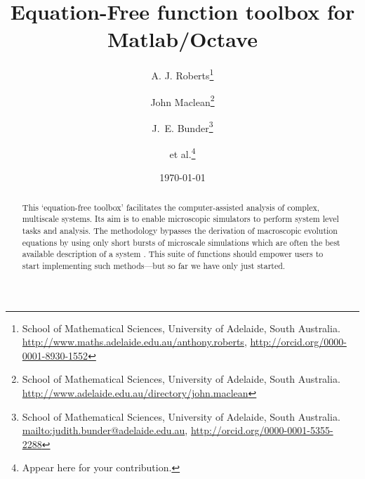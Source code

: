 \documentclass[11pt,a5paper,twoside]{article}
\title{Equation-Free function toolbox for Matlab/Octave}
\author{A. J. Roberts\thanks{%
School of Mathematical Sciences, University of Adelaide, South Australia.
\url{http://www.maths.adelaide.edu.au/anthony.roberts},
\url{http://orcid.org/0000-0001-8930-1552}}
\and John Maclean\thanks{%
School of Mathematical Sciences, University of Adelaide, South Australia.
\url{http://www.adelaide.edu.au/directory/john.maclean}}
\and J.~E. Bunder\thanks{%
School of Mathematical Sciences, University of Adelaide, South Australia.
\protect\url{mailto:judith.bunder@adelaide.edu.au},
\protect\url{http://orcid.org/0000-0001-5355-2288}}
\and et al.\thanks{Appear here for your contribution.}
}
\date{\today}
\makeatletter
\def\fancyvrbStartStop{%
  \edef\FancyVerbStartString{\@percentchar\@charrb} 
  \edef\FancyVerbStopString{\@percentchar\@charlb} }
\makeatother
\begin{document}

\maketitle

\begin{abstract}
This `equation-free toolbox' facilitates the computer-assisted analysis of complex, multiscale systems.
Its aim is to enable microscopic simulators to perform system level tasks and analysis.
The methodology bypasses the derivation of macroscopic evolution equations by using only short bursts of microscale simulations which are often the best available description of a system
\cite[e.g.]{Kevrekidis09a, Kevrekidis04a, Kevrekidis03b}.
This suite of functions should empower users to start implementing such methods---but so far we have only just started.
\end{abstract}

\tableofcontents
{}


\fancyvrbStartStop 



%

%


%

%

\appendix
\let\FancyVerbStartString\relax 
\let\FancyVerbStopString\relax




\end{document}
